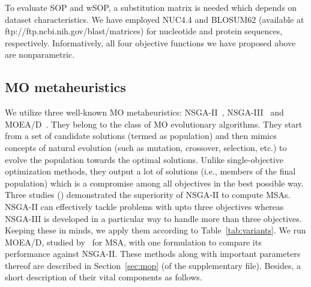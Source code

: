To evaluate SOP and wSOP, a substitution matrix is needed which depends on dataset characteristics. We have employed NUC4.4 and BLOSUM62 (available at ftp://ftp.ncbi.nih.gov/blast/matrices) for nucleotide and protein sequences, respectively. Informatively, all four objective functions we have proposed above are nonparametric.\subsection{MO metaheuristics}
We utilize three well-known MO metaheuristics: NSGA-II~\citep{deb2002fast}, NSGA-III~\citep{deb2014evolutionary} and MOEA/D~\citep{zhang2007moea}. They belong to the class of MO evolutionary algorithms. They start from a set of candidate solutions (termed as population) and then mimics concepts of natural evolution (such as mutation, crossover, selection, etc.) to evolve the population towards the optimal solutions. Unlike single-objective optimization methods, they output a lot of solutions (i.e., members of the final population) which is a compromise among all objectives in the best possible way. Three studies (\citep{zambrano2017m2align, ortuno2013optimizing, zambrano2017comparing}) demonstrated the superiority of NSGA-II to compute MSAs. NSGA-II can effectively tackle problems with upto three objectives whereas NSGA-III is developed in a particular way to handle more than three objectives. Keeping these in minds, we apply them according to Table~\ref{tab:variants}. We run MOEA/D, studied by~\cite{zhu2015novel} for MSA, with one formulation to compare its performance against NSGA-II.
These methods along with important parameters thereof are described in Section~\ref{sec:mop} (of the supplementary file). Besides, a short description of their vital components as follows. 
